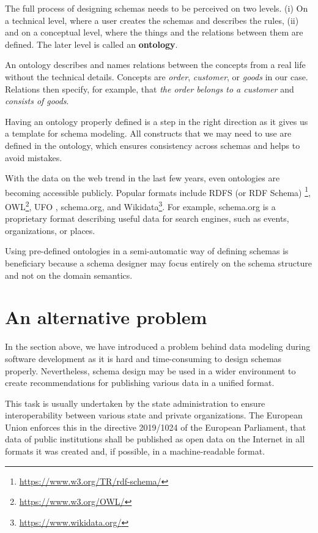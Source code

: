 The full process of designing schemas needs to be perceived on two levels. (i) On a technical level, where a user creates the schemas and describes the rules, (ii) and on a conceptual level, where the things and the relations between them are defined. The later level is called an \textbf{ontology}.

An ontology describes and names relations between the concepts from a real life without the technical details. Concepts are \textit{order}, \textit{customer}, or \textit{goods} in our case. Relations then specify, for example, that \textit{the order belongs to a customer} and \textit{consists of goods}.

Having an ontology properly defined is a step in the right direction as it gives us a template for schema modeling. All constructs that we may need to use are defined in the ontology, which ensures consistency across schemas and helps to avoid mistakes.

\medskip

With the data on the web \cite{data-on-the-web} trend in the last few years, even ontologies are becoming accessible publicly. Popular formats include RDFS (or RDF Schema) \footnote{\url{https://www.w3.org/TR/rdf-schema/}}, OWL\footnote{\url{https://www.w3.org/OWL/}}, UFO \cite{ufo22}, schema.org, and Wikidata\footnote{\url{https://www.wikidata.org/}}. For example, schema.org is a proprietary format describing useful data for search engines, such as events, organizations, or places.

Using pre-defined ontologies in a semi-automatic way of defining schemas is beneficiary because a schema designer may focus entirely on the schema structure and not on the domain semantics.

\section*{An alternative problem}

In the section above, we have introduced a problem behind data modeling during software development as it is hard and time-consuming to design schemas properly. Nevertheless, schema design may be used in a wider environment to create recommendations for publishing various data in a unified format.

This task is usually undertaken by the state administration to ensure interoperability between various state and private organizations. The European Union enforces this in the directive 2019/1024 of the European Parliament, that data of public institutions shall be published as open data on the Internet in all formats it was created and, if possible, in a machine-readable format.

